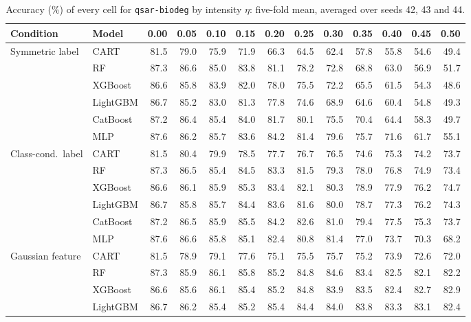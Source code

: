 \begin{table}[p]
\centering
\tiny
\setlength{\tabcolsep}{2.6pt}
\caption{Accuracy (\%) of every cell for \texttt{qsar-biodeg} by intensity $\eta$: five-fold mean, averaged over seeds 42, 43 and 44.}
\label{tab:grid_qsar_biodeg}
\begin{tabular}{@{}llrrrrrrrrrrr@{}}
\toprule
Condition & Model & 0.00 & 0.05 & 0.10 & 0.15 & 0.20 & 0.25 & 0.30 & 0.35 & 0.40 & 0.45 & 0.50 \\
\midrule
Symmetric label & CART & 81.5 & 79.0 & 75.9 & 71.9 & 66.3 & 64.5 & 62.4 & 57.8 & 55.8 & 54.6 & 49.4 \\
 & RF & 87.3 & 86.6 & 85.0 & 83.8 & 81.1 & 78.2 & 72.8 & 68.8 & 63.0 & 56.9 & 51.7 \\
 & XGBoost & 86.6 & 85.8 & 83.9 & 82.0 & 78.0 & 75.5 & 72.2 & 65.5 & 61.5 & 54.3 & 48.6 \\
 & LightGBM & 86.7 & 85.2 & 83.0 & 81.3 & 77.8 & 74.6 & 68.9 & 64.6 & 60.4 & 54.8 & 49.3 \\
 & CatBoost & 87.2 & 86.4 & 85.4 & 84.0 & 81.7 & 80.1 & 75.5 & 70.4 & 64.4 & 58.3 & 49.7 \\
 & MLP & 87.6 & 86.2 & 85.7 & 83.6 & 84.2 & 81.4 & 79.6 & 75.7 & 71.6 & 61.7 & 55.1 \\
\midrule
Class-cond.\ label & CART & 81.5 & 80.4 & 79.9 & 78.5 & 77.7 & 76.7 & 76.5 & 74.6 & 75.3 & 74.2 & 73.7 \\
 & RF & 87.3 & 86.5 & 85.4 & 84.5 & 83.3 & 81.5 & 79.3 & 78.0 & 76.8 & 74.9 & 73.4 \\
 & XGBoost & 86.6 & 86.1 & 85.9 & 85.3 & 83.4 & 82.1 & 80.3 & 78.9 & 77.9 & 76.2 & 74.7 \\
 & LightGBM & 86.7 & 85.8 & 85.7 & 84.4 & 83.6 & 81.6 & 80.0 & 78.7 & 77.3 & 76.2 & 74.3 \\
 & CatBoost & 87.2 & 86.5 & 85.9 & 85.5 & 84.2 & 82.6 & 81.0 & 79.4 & 77.5 & 75.3 & 73.7 \\
 & MLP & 87.6 & 86.6 & 85.8 & 85.1 & 82.4 & 80.8 & 81.4 & 77.0 & 73.7 & 70.3 & 68.2 \\
\midrule
Gaussian feature & CART & 81.5 & 78.9 & 79.1 & 77.6 & 75.1 & 75.5 & 75.7 & 75.2 & 73.9 & 72.6 & 72.0 \\
 & RF & 87.3 & 85.9 & 86.1 & 85.8 & 85.2 & 84.8 & 84.6 & 83.4 & 82.5 & 82.1 & 82.2 \\
 & XGBoost & 86.6 & 85.6 & 86.1 & 85.4 & 85.2 & 84.8 & 83.9 & 83.5 & 82.4 & 82.7 & 82.9 \\
 & LightGBM & 86.7 & 86.2 & 85.4 & 85.2 & 85.4 & 84.4 & 84.0 & 83.8 & 83.3 & 83.1 & 82.4 \\

\end{tabular}
\end{table}

